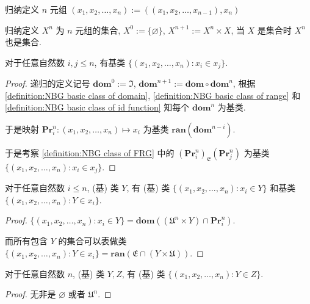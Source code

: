 \begin{definition}
    \label {definition:n element tuple}
    归纳定义 \(n\) 元组 \((x_1, x_2, \dots, x_n) := ((x_1, x_2, \dots, x_{n-1}),x_n)\)

    \label {definition:nth product of a set}
    归纳定义 \(X^n\) 为 \(n\) 元组的集合, \(X^0 := \{\varnothing\}\), \(X^{n + 1} := X^n \times X\), 当 \(X\) 是集合时 \(X^n\) 也是集合.
\end{definition}

\begin{lemma}
    对于任意自然数 \(i,j \le n\), 有基类 \(\{(x_1, x_2, \dots ,x_n) : x_i \in x_j\}\).

    \begin{proof}
        递归的定义记号 \(\mathbf{dom}^0 := \mathfrak{I}\), \(\mathbf{dom}^{n+1} := \mathbf{dom} \circ \mathbf{dom}^n\),
        根据 \ref{definition:NBG basic class of domain}, \ref{definition:NBG basic class of range} 和 \ref{definition:NBG basic class of id function} 知每个 \(\mathbf{dom}^n\) 为基类.

        于是映射 \(\mathbf{Pr}_{i}^{n} :(x_1, x_2, \dots, x_n) \mapsto x_i\) 为基类 \(\mathbf{ran} (\mathbf{dom}^{n-i})\).

        于是考察 \ref{definition:NBG class of FRG} 中的 \({(\mathbf{Pr}_{i}^{n})}_{\mathfrak{E}} (\mathbf{Pr}_{j}^{n})\) 为基类 \(\{(x_1, x_2, \dots ,x_n) : x_i \in x_j\}\).
    \end{proof}
\end{lemma}

\begin{lemma}
    对于任意自然数 \(i \le n\), (基) 类 \(Y\), 有 (基) 类 \(\{(x_1, x_2, \dots ,x_n) : x_i \in Y\}\) 和基类 \(\{(x_1, x_2, \dots ,x_n) : Y \in x_i\}\).

    \begin{proof}
        \(\{(x_1, x_2, \dots ,x_n) : x_i \in Y\} = \mathbf{dom} ((\mathfrak{U}^n \times Y) \cap \mathbf{Pr}_{i}^{n})\).

        而所有包含 \(Y\) 的集合可以表做类 \(\{(x_1, x_2, \dots ,x_n) : Y \in x_i\} = \mathbf{ran} (\mathfrak{E} \cap (Y \times \mathfrak{U}))\).
    \end{proof}
\end{lemma}

\begin{lemma}
    对于任意自然数 \(n\), (基) 类 \(Y,Z\), 有 (基) 类 \(\{(x_1, x_2, \dots ,x_n) : Y \in Z\}\).

    \begin{proof}
        无非是 \(\varnothing\) 或者 \(\mathfrak{U}^n\).
    \end{proof}
\end{lemma}

